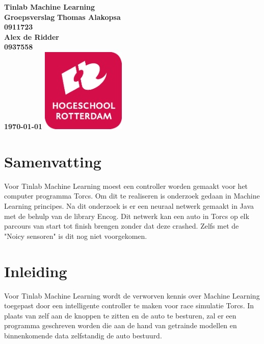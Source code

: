 \documentclass{article}
\begin{document}
\sffamily
\begin{titlepage}
  \centering
    \vfill
    {\bfseries\Huge
      Tinlab Machine Learning \\
      Groepsverslag
        \vskip2cm
      }
      {\bfseries\Large
      	Thomas Alakopsa\\
      	{ \bfseries\normalsize
      	0911723\\
      	}
      }
      {\bfseries\Large
      	Alex de Ridder\\
      	{ \bfseries\normalsize
      	0937558\\
      	}
      }
      {
        \bfseries\normalsize
        \vskip2cm
        \today
    }    
    \vfill
    \includegraphics[width=4cm]{logohr.png}
    \vfill
    \vfill
\end{titlepage}
\newpage

\section{Samenvatting}
Voor Tinlab Machine Learning moest een controller worden gemaakt voor het computer programma Torcs. Om dit te realiseren is onderzoek gedaan in Machine Learning principes. Na dit onderzoek is er een neuraal netwerk gemaakt in Java met de behulp van de library Encog. Dit netwerk kan een auto in Torcs op elk parcours van start tot finish brengen zonder dat deze crashed. Zelfs met de "Noicy sensoren" is dit nog niet voorgekomen. 
\pagebreak
\section{Inleiding}
Voor Tinlab Machine Learning wordt de verworven kennis over Machine Learning toegepast door een intelligente controller te maken voor race simulatie Torcs. In plaats van zelf aan de knoppen te zitten en de auto te besturen, zal er een programma geschreven worden die aan de hand van getrainde modellen en binnenkomende data zelfstandig de auto bestuurd. 
\end{document}
